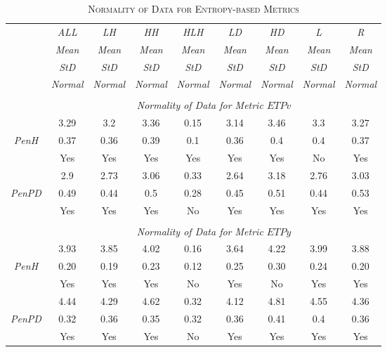 \begin{table}[h]
\centering
\caption{\textsc{Normality of Data for Entropy-based Metrics}}
\begin{tabular*}{1\textwidth}{@{\extracolsep{\fill}} c | c  c  c  c  c  c  c  c}
	& {\textit{ALL}} & {\textit{LH}} & {\textit{HH}} & {\textit{HLH}} & {\textit{LD}} & {\textit{HD}} & {\textit{L}} & {\textit{R}} \\
	\cline{2-9} 
	\cline{2-9} 
	& {\textit{Mean}} & {\textit{Mean}} & {\textit{Mean}} & {\textit{Mean}} & {\textit{Mean}} & {\textit{Mean}} & {\textit{Mean}} & {\textit{Mean}} \\
	& {\textit{StD}} & {\textit{StD}} & {\textit{StD}} & {\textit{StD}} & {\textit{StD}} & {\textit{StD}} & {\textit{StD}} & {\textit{StD}} \\
	& {\textit{Normal}} & {\textit{Normal}} & {\textit{Normal}} & {\textit{Normal}} & {\textit{Normal}} & {\textit{Normal}} & {\textit{Normal}} & {\textit{Normal}} \\
	\cline{2-9}
	\\
	& \multicolumn{8}{c}{\textit{Normality of Data for Metric $ETPv$}} \\
	\hline 	\hline
	& 3.29 & 3.2 & 3.36 & 0.15 & 3.14 & 3.46 & 3.3 & 3.27 \\
	{\textit{PenH}} & 0.37 & 0.36 & 0.39 & 0.1 & 0.36 & 0.4 & 0.4 & 0.37 \\
	& Yes & Yes & Yes & Yes & Yes & Yes & No & Yes \\
	\hline
	& 2.9 & 2.73 & 3.06 & 0.33 & 2.64 & 3.18 & 2.76 & 3.03 \\
	{\textit{PenPD}} & 0.49 & 0.44 & 0.5 & 0.28 & 0.45 & 0.51 & 0.44 & 0.53 \\
	& Yes & Yes & Yes & No & Yes & Yes & Yes & Yes \\
	\\
	& \multicolumn{8}{c}{\textit{Normality of Data for Metric $ETPy$}} \\
	\hline 	\hline
	& 3.93 & 3.85 & 4.02 & 0.16 & 3.64 & 4.22 & 3.99 & 3.88 \\
	{\textit{PenH}} & 0.20 & 0.19 & 0.23 & 0.12 & 0.25 & 0.30 & 0.24 & 0.20 \\
	& Yes & Yes & Yes & No & Yes & No & Yes & Yes \\
	\hline
	& 4.44 & 4.29 & 4.62 & 0.32 & 4.12 & 4.81 & 4.55 & 4.36 \\
	{\textit{PenPD}} & 0.32 & 0.36 & 0.35 & 0.32 & 0.36 & 0.41 & 0.4 & 0.36 \\
	& Yes & Yes & Yes & No & Yes & Yes & Yes & Yes \\

\end{tabular*}
\end{table}
